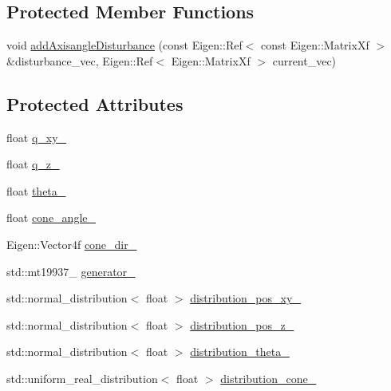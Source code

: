 \subsection*{Protected Member Functions}
\begin{DoxyCompactItemize}
\item 
void \hyperlink{classBrownianMotionPose_ad5da23c2e31dd9522115ae925a35e66e}{add\+Axisangle\+Disturbance} (const Eigen\+::\+Ref$<$ const Eigen\+::\+Matrix\+Xf $>$ \&disturbance\+\_\+vec, Eigen\+::\+Ref$<$ Eigen\+::\+Matrix\+Xf $>$ current\+\_\+vec)
\end{DoxyCompactItemize}
\subsection*{Protected Attributes}
\begin{DoxyCompactItemize}
\item 
float \hyperlink{classBrownianMotionPose_ac457166961355c8073b93e616ec80741}{q\+\_\+xy\+\_\+}
\item 
float \hyperlink{classBrownianMotionPose_ac5c6eb8bc9bbd4a2e2fb4a70d89c3c8d}{q\+\_\+z\+\_\+}
\item 
float \hyperlink{classBrownianMotionPose_a708069c13925ecb0d11a58519948bf1b}{theta\+\_\+}
\item 
float \hyperlink{classBrownianMotionPose_af1034131a88f7af082bc57eb22d036d5}{cone\+\_\+angle\+\_\+}
\item 
Eigen\+::\+Vector4f \hyperlink{classBrownianMotionPose_a9b58ff8fe85e0fda78a48e4df3fccce0}{cone\+\_\+dir\+\_\+}
\item 
std\+::mt19937\+\_ \hyperlink{classBrownianMotionPose_adf2ae882f026fc526fc29e065bd94162}{generator\+\_\+}
\item 
std\+::normal\+\_\+distribution$<$ float $>$ \hyperlink{classBrownianMotionPose_aa9e8e055568eef783491b424ceb54c37}{distribution\+\_\+pos\+\_\+xy\+\_\+}
\item 
std\+::normal\+\_\+distribution$<$ float $>$ \hyperlink{classBrownianMotionPose_af6c2e7851b82a082e2a5e6885ba93dea}{distribution\+\_\+pos\+\_\+z\+\_\+}
\item 
std\+::normal\+\_\+distribution$<$ float $>$ \hyperlink{classBrownianMotionPose_afc3109f6d9c6b677f4720fb87a2ea51b}{distribution\+\_\+theta\+\_\+}
\item 
std\+::uniform\+\_\+real\+\_\+distribution$<$ float $>$ \hyperlink{classBrownianMotionPose_ad63f33718f94018f88908bb0d661a4e1}{distribution\+\_\+cone\+\_\+}
\item 

\end{DoxyCompactItemize}
